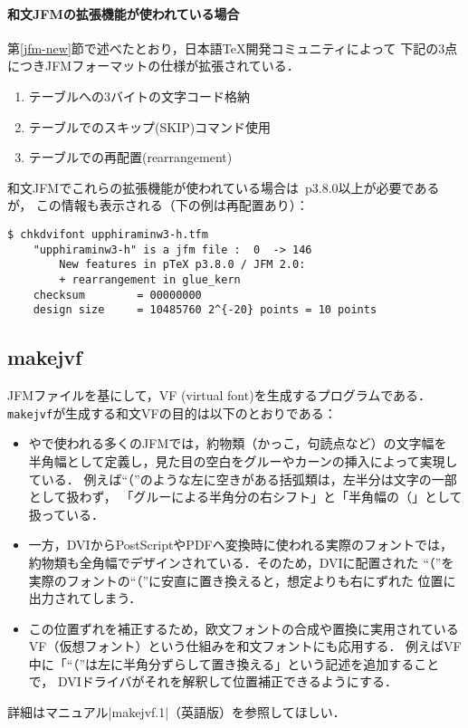 \documentclass[a4paper,11pt,nomag]{jsarticle}
\def\code#1{\texttt{#1}}
\begin{document}
\paragraph{和文JFMの拡張機能が使われている場合}
第\ref{jfm-new}節で述べたとおり，日本語\TeX 開発コミュニティによって
下記の3点につきJFMフォーマットの仕様が拡張されている．
\begin{enumerate}
  \item {}テーブルへの3バイトの文字コード格納
  \item {}テーブルでのスキップ(SKIP)コマンド使用
  \item {}テーブルでの再配置(rearrangement)
\end{enumerate}
和文JFMでこれらの拡張機能が使われている場合は\pTeX~p3.8.0以上が必要であるが，
この情報も表示される（下の例は再配置あり）：
\begin{verbatim}
$ chkdvifont upphiraminw3-h.tfm
    "upphiraminw3-h" is a jfm file :  0  -> 146
        New features in pTeX p3.8.0 / JFM 2.0:
        + rearrangement in glue_kern
    checksum        = 00000000
    design size     = 10485760 2^{-20} points = 10 points
\end{verbatim}

\subsection{makejvf}\label{makejvf}

JFMファイルを基にして，VF (virtual font)を生成するプログラムである．
\code{makejvf}が生成する和文VFの目的は以下のとおりである：
\begin{itemize}
  \item \pTeX や\upTeX で使われる多くのJFMでは，約物類（かっこ，句読点など）の文字幅を
    半角幅として定義し，見た目の空白をグルーやカーンの挿入によって実現している．
    例えば``（''のような左に空きがある括弧類は，左半分は文字の一部として扱わず，
    「グルーによる半角分の右シフト」と「半角幅の\inhibitglue （」として扱っている．
  \item 一方，DVIからPostScriptやPDFへ変換時に使われる実際のフォントでは，
    約物類も全角幅でデザインされている．そのため，DVIに配置された
    ``（''を実際のフォントの``（''に安直に置き換えると，想定よりも右にずれた
    位置に出力されてしまう．
  \item この位置ずれを補正するため，欧文フォントの合成や置換に実用されている
    VF（仮想フォント）という仕組みを和文フォントにも応用する．
    例えばVF中に「``（''は左に半角分ずらして置き換える」という記述を追加することで，
    DVIドライバがそれを解釈して位置補正できるようにする．
\end{itemize}
詳細はマニュアル|makejvf.1|（英語版）を参照してほしい．
\end{document}
